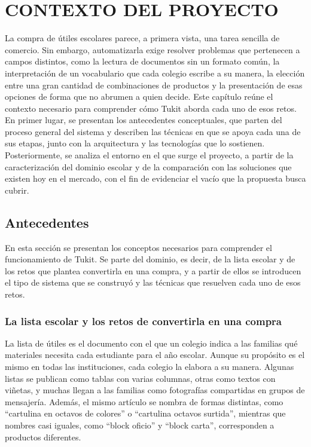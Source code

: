 \setcounter{subsection}{0}
\section{CONTEXTO DEL PROYECTO}

La compra de útiles escolares parece, a primera vista, una tarea sencilla de comercio. Sin
embargo, automatizarla exige resolver problemas que pertenecen a campos distintos, como la
lectura de documentos sin un formato común, la interpretación de un vocabulario que cada
colegio escribe a su manera, la elección entre una gran cantidad de combinaciones de
productos y la presentación de esas opciones de forma que no abrumen a quien decide. Este
capítulo reúne el contexto necesario para comprender cómo Tukit aborda cada uno de esos
retos. En primer lugar, se presentan los antecedentes conceptuales, que parten del proceso
general del sistema y describen las técnicas en que se apoya cada una de sus etapas, junto
con la arquitectura y las tecnologías que lo sostienen. Posteriormente, se analiza el
entorno en el que surge el proyecto, a partir de la caracterización del dominio escolar y
de la comparación con las soluciones que existen hoy en el mercado, con el fin de evidenciar
el vacío que la propuesta busca cubrir.\par

\subsection{Antecedentes}

En esta sección se presentan los conceptos necesarios para comprender el funcionamiento de
Tukit. Se parte del dominio, es decir, de la lista escolar y de los retos que plantea
convertirla en una compra, y a partir de ellos se introducen el tipo de sistema que se
construyó y las técnicas que resuelven cada uno de esos retos.\par

\subsubsection{La lista escolar y los retos de convertirla en una compra}

La lista de útiles es el documento con el que un colegio indica a las familias qué
materiales necesita cada estudiante para el año escolar. Aunque su propósito es el mismo en
todas las instituciones, cada colegio la elabora a su manera. Algunas listas se publican
como tablas con varias columnas, otras como textos con viñetas, y muchas llegan a las
familias como fotografías compartidas en grupos de mensajería. Además, el mismo artículo se
nombra de formas distintas, como ``cartulina en octavos de colores'' o ``cartulina octavos
surtida'', mientras que nombres casi iguales, como ``block oficio'' y ``block carta'',
corresponden a productos diferentes.\par

